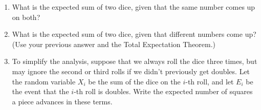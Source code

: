 \documentclass[12pt]{article}
\begin{document}
\begin{enumerate}
    \item What is the expected sum of two dice, given that the same
number comes up on both?


\item What is the expected sum of two dice, given that different
numbers come up?  (Use your previous answer and the Total Expectation
Theorem.)


\instatements{\newpage}

\item To simplify the analysis, suppose that we always roll the dice
three times, but may ignore the second or third rolls if we didn't
previously get doubles.  Let the random variable $X_i$ be the sum of
the dice on the $i$-th roll, and let $E_i$ be the event that the
$i$-th roll is doubles.  Write the expected number of squares a piece
advances in these terms.


\end{enumerate}
\end{document}
